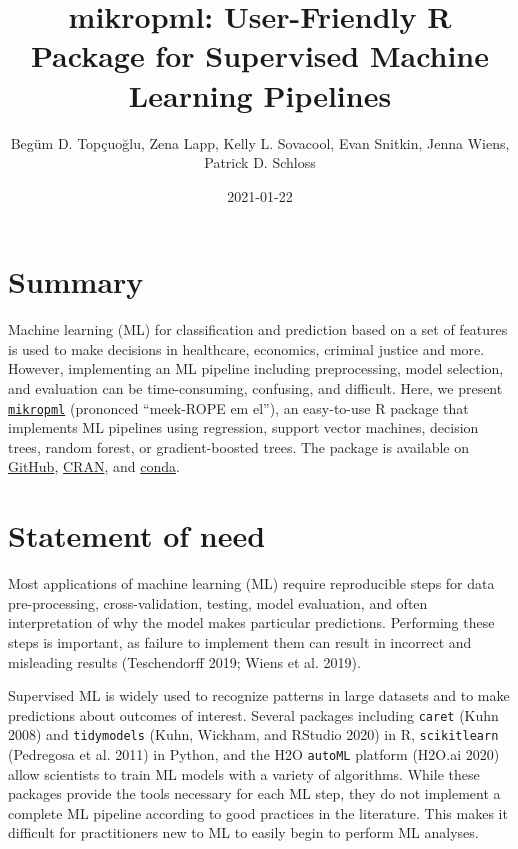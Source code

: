 \documentclass[
]{article}
\title{mikropml: User-Friendly R Package for Supervised Machine Learning
Pipelines}
\author{Begüm D. Topçuoğlu, Zena Lapp, Kelly L. Sovacool, Evan Snitkin, Jenna
Wiens, Patrick D. Schloss}
\date{2021-01-22}
\begin{document}
\maketitle

\hypertarget{summary}{%
\section{Summary}\label{summary}}

Machine learning (ML) for classification and prediction based on a set
of features is used to make decisions in healthcare, economics, criminal
justice and more. However, implementing an ML pipeline including
preprocessing, model selection, and evaluation can be time-consuming,
confusing, and difficult. Here, we present
\href{http://www.schlosslab.org/mikropml/}{\texttt{mikropml}} (prononced
``meek-ROPE em el''), an easy-to-use R package that implements ML
pipelines using regression, support vector machines, decision trees,
random forest, or gradient-boosted trees. The package is available on
\href{https://github.com/SchlossLab/mikropml/}{GitHub},
\href{https://cran.r-project.org/package=mikropml}{CRAN}, and
\href{https://anaconda.org/conda-forge/r-mikropml}{conda}.

\hypertarget{statement-of-need}{%
\section{Statement of need}\label{statement-of-need}}

Most applications of machine learning (ML) require reproducible steps
for data pre-processing, cross-validation, testing, model evaluation,
and often interpretation of why the model makes particular predictions.
Performing these steps is important, as failure to implement them can
result in incorrect and misleading results (Teschendorff 2019; Wiens et
al. 2019).

Supervised ML is widely used to recognize patterns in large datasets and
to make predictions about outcomes of interest. Several packages
including \texttt{caret} (Kuhn 2008) and \texttt{tidymodels} (Kuhn,
Wickham, and RStudio 2020) in R, \texttt{scikitlearn} (Pedregosa et al.
2011) in Python, and the H2O \texttt{autoML} platform (H2O.ai 2020)
allow scientists to train ML models with a variety of algorithms. While
these packages provide the tools necessary for each ML step, they do not
implement a complete ML pipeline according to good practices in the
literature. This makes it difficult for practitioners new to ML to
easily begin to perform ML analyses.
\end{document}
